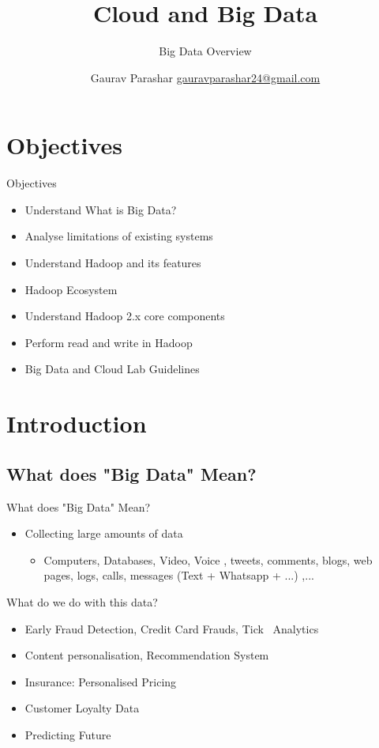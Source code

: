 \documentclass[pdf]{beamer}
\title{Cloud and Big Data}
\subtitle{Big Data Overview}
\author{Gaurav Parashar \newline\url{gauravparashar24@gmail.com}
\newline{Lecture 1-3}}
\begin{document}

\begin{frame}
	\thispagestyle{empty}
	\titlepage
\end{frame}
\addtocounter{framenumber}{-1}

\section{Objectives}
\begin{frame}{Objectives}
	\begin{itemize}
		\item Understand What is Big Data? \pause
		\item Analyse limitations of existing systems \pause
		\item Understand Hadoop and its features \pause
		\item Hadoop Ecosystem \pause
		\item Understand Hadoop 2.x core components \pause
		\item Perform read and write in Hadoop \pause
		\item Big Data and Cloud Lab Guidelines 
	\end{itemize}
\end{frame}


\section{Introduction}

\subsection{What does "Big Data" Mean?}

\begin{frame}{What does "Big Data" Mean?}
	\begin{itemize}
		\pause
		\item Collecting large amounts of data
		\pause
		\begin{itemize}
			\item Computers, Databases, Video, Voice , tweets, comments, blogs, web pages, logs, calls, messages (Text + Whatsapp + ...) ,...
		\end{itemize}
	\end{itemize}
\pause
 What do we do with this data?	
\begin{itemize}
		\pause
		\item Early Fraud Detection, Credit Card Frauds, Tick~\cite{tic} Analytics 
		\pause
		\item Content personalisation, Recommendation System  
		\pause
		\item Insurance: Personalised Pricing
		\pause
		\item Customer Loyalty Data
		\pause
		\item Predicting Future
	\end{itemize}
\end{frame}
\end{document}
